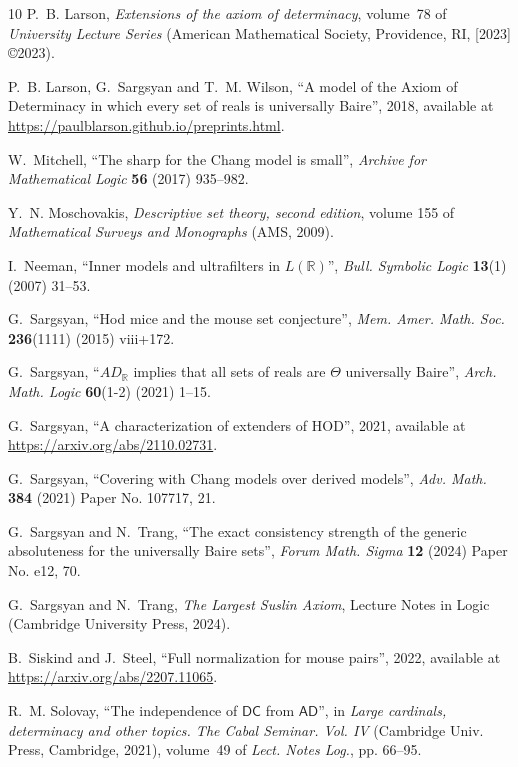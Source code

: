 \documentclass{amsart}
\begin{document}
\begin{thebibliography}{10}
P.~B. Larson, \emph{Extensions of the axiom of determinacy}, volume~78 of
  \emph{University Lecture Series} (American Mathematical Society, Providence,
  RI, [2023] \copyright 2023).

P.~B. Larson, G.~Sargsyan and T.~M. Wilson, \enquote{{A model of the Axiom of
  Determinacy in which every set of reals is universally Baire}}, 2018,
  available at \url{https://paulblarson.github.io/preprints.html}.

W.~Mitchell, \enquote{{The sharp for the Chang model is small}}, \emph{{Archive
  for Mathematical Logic}} \textbf{56} (2017) 935--982.

Y.~N. Moschovakis, \emph{Descriptive set theory, second edition}, volume 155 of
  \emph{Mathematical Surveys and Monographs} (AMS, 2009).

I.~Neeman, \enquote{Inner models and ultrafilters in {$L(\mathbb R)$}},
  \emph{Bull. Symbolic Logic} \textbf{13}(1) (2007) 31--53.

G.~Sargsyan, \enquote{Hod mice and the mouse set conjecture}, \emph{Mem. Amer.
  Math. Soc.} \textbf{236}(1111) (2015) viii+172.

G.~Sargsyan, \enquote{{$AD_{\mathbb R}$} implies that all sets of reals are
  {$\Theta$} universally {B}aire}, \emph{Arch. Math. Logic} \textbf{60}(1-2)
  (2021) 1--15.

G.~Sargsyan, \enquote{A characterization of extenders of {HOD}}, 2021,
  available at \url{https://arxiv.org/abs/2110.02731}.

G.~Sargsyan, \enquote{Covering with {C}hang models over derived models},
  \emph{Adv. Math.} \textbf{384} (2021) Paper No. 107717, 21.

G.~Sargsyan and N.~Trang, \enquote{The exact consistency strength of the
  generic absoluteness for the universally {B}aire sets}, \emph{Forum Math.
  Sigma} \textbf{12} (2024) Paper No. e12, 70.

G.~Sargsyan and N.~Trang, \emph{The {L}argest {S}uslin {A}xiom}, Lecture Notes
  in Logic (Cambridge University Press, 2024).

B.~Siskind and J.~Steel, \enquote{Full normalization for mouse pairs}, 2022,
  available at \url{https://arxiv.org/abs/2207.11065}.

R.~M. Solovay, \enquote{The independence of {$\mathsf{DC}$} from
  {$\mathsf{AD}$}}, in \emph{Large cardinals, determinacy and other topics.
  {T}he {C}abal {S}eminar. {V}ol. {IV}} (Cambridge Univ. Press, Cambridge,
  2021), volume~49 of \emph{Lect. Notes Log.}, pp. 66--95.


\end{thebibliography}
\end{document}
